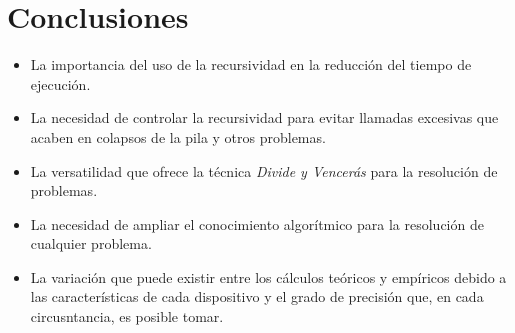 \documentclass[a4paper,12pt,twoside]{article} %
\begin{document}
\newpage

\section{Conclusiones} 

\begin{itemize}
	\item La importancia del uso de la recursividad en la reducción del tiempo de ejecución.
	\item La necesidad de controlar la recursividad para evitar llamadas excesivas que acaben en colapsos de la pila y otros problemas.
	\item La versatilidad que ofrece la técnica \textit{Divide y Vencerás} para la resolución de problemas.
	\item La necesidad de ampliar el conocimiento algorítmico para la resolución de cualquier problema.
	\item La variación que puede existir entre los cálculos teóricos y empíricos debido a las características de cada dispositivo y el grado de precisión que, en cada circusntancia, es posible tomar.
	

\end{itemize}
\end{document}
